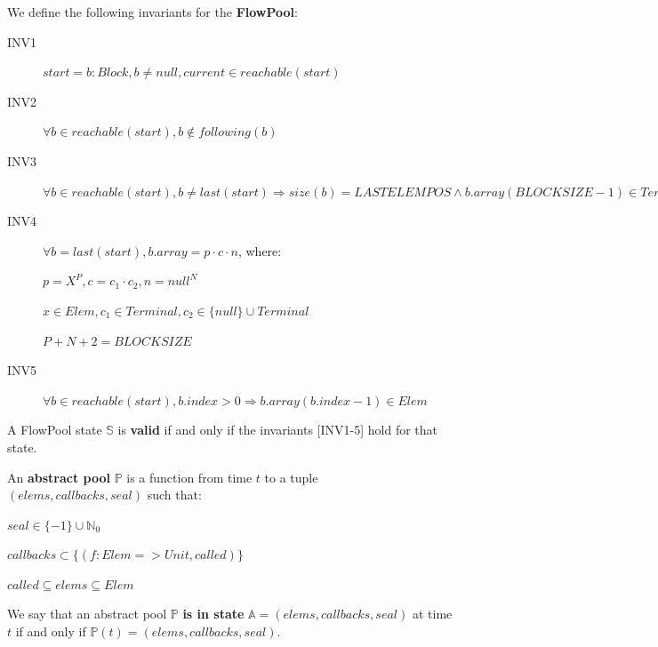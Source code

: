 \documentclass[runningheads,a4paper]{llncs}
\begin{document}
\begin{definition}[Invariants]
We define the following invariants for the \textbf{FlowPool}:
\begin{description}
\item[INV1] $start = b: Block, b \neq null, current \in reachable(start)$
\item[INV2] $\forall b \in reachable(start), b \not \in following(b)$
\item[INV3] $\forall b \in reachable(start), b \neq last(start) \Rightarrow size(b) = LASTELEMPOS \wedge b.array(BLOCKSIZE - 1) \in Terminal$
\item[INV4]
$\forall b = last(start), b.array = p \cdot c \cdot n$, where:

$p = X^P, c = c_1 \cdot c_2, n = null^N$

$x \in Elem, c_1 \in Terminal, c_2 \in \{null\} \cup Terminal$

$P + N + 2 = BLOCKSIZE$
\item[INV5] $\forall b \in reachable(start), b.index > 0 \Rightarrow b.array(b.index - 1) \in Elem$
\end{description}
\end{definition}


\begin{definition}[Validity]
A FlowPool state $\mathbb{S}$ is \textbf{valid} if and only if the invariants [INV1-5] hold for that state.
\end{definition}


\begin{definition}
An \textbf{abstract pool} $\mathbb{P}$ is a function from time $t$ to a tuple $(elems, callbacks, seal)$ such that:
\begin{description}
\item $seal \in \{ -1 \} \cup \mathbb{N}_0$
\item $callbacks \subset \{ (f: Elem => Unit, called) \}$
\item $called \subseteq elems \subseteq Elem$
\end{description}
We say that an abstract pool $\mathbb{P}$ \textbf{is in state}
$\mathbb{A} = (elems, callbacks, seal)$ at time $t$ if and only if $\mathbb{P}(t) = (elems, callbacks, seal)$.
\end{definition}
\end{document}
